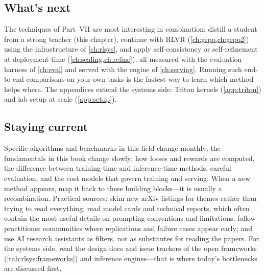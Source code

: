 \subsection{What's next}

The techniques of Part~VII are most interesting in combination: distill a student from a strong
teacher (this chapter), continue with RLVR (\cref{ch:grpo,ch:grpo2}) using the infrastructure of
\cref{ch:rlsys}, and apply self-consistency or self-refinement at deployment time
(\cref{ch:scaling,ch:refine}), all measured with the evaluation harness of \cref{ch:eval} and served
with the engine of \cref{ch:serving}. Running such end-to-end comparisons on your own tasks is
the fastest way to learn which method helps where. The appendices extend the systems side:
Triton kernels (\cref{app:triton}) and lab setup at scale (\cref{app:setup}).

\subsection{Staying current}

Specific algorithms and benchmarks in this field change monthly; the fundamentals in this book
change slowly: how losses and rewards are computed, the difference between training-time and
inference-time methods, careful evaluation, and the cost models that govern training and
serving. When a new method appears, map it back to these building blocks---it is usually a
recombination. Practical sources: skim new arXiv listings for themes rather than trying to read
everything; read model cards and technical reports, which often contain the most useful details
on prompting conventions and limitations; follow practitioner communities where replications and
failure cases appear early; and use AI research assistants as filters, not as substitutes for
reading the papers. For the systems side, read the design docs and issue trackers of the open
frameworks (\cref{tab:rlsys:frameworks}) and inference engines---that is where today's
bottlenecks are discussed first.

